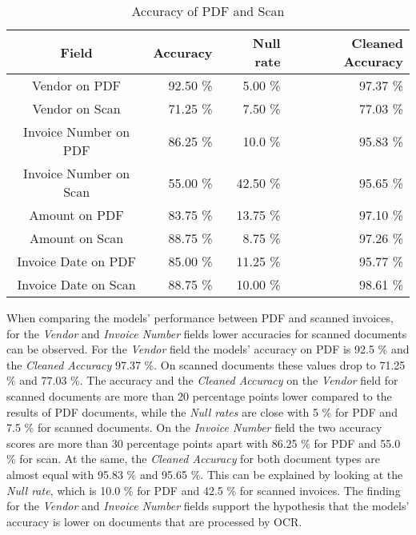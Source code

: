 \begin{table}[ht]   %
    \centering
    \footnotesize
    \begin{tabular}{c|rrr} %
        \toprule    %
        Field  & Accuracy  & Null rate & Cleaned Accuracy \\
        \midrule    %
        Vendor on PDF    & 92.50 \%   &  5.00 \%   & 97.37 \% \\
        Vendor on Scan   & 71.25 \%   &  7.50 \%   & 77.03 \% \\
        \midrule    %
        Invoice Number on PDF & 86.25 \%   & 10.0 \%  & 95.83 \%\\
        Invoice Number on Scan & 55.00 \%  & 42.50 \%  & 95.65 \%\\
        \midrule    %
        Amount on PDF      & 83.75 \%   & 13.75 \%  & 97.10 \% \\
        Amount on Scan     & 88.75 \%   & 8.75 \%  & 97.26 \% \\
        \midrule    %
        Invoice Date on PDF  & 85.00 \%   & 11.25  \%  & 95.77 \% \\
        Invoice Date on Scan & 88.75 \%   & 10.00  \%  & 98.61 \% \\
        
        \bottomrule %
    \end{tabular}
    \caption{Accuracy of PDF and Scan}
    \label{table:Field_Com_Scan_PDF}
\end{table}

When comparing the models' performance between PDF and scanned invoices, for the \textit{Vendor} and \textit{Invoice Number} fields lower accuracies for scanned documents can be observed. For the \textit{Vendor} field the models' accuracy on PDF is 92.5 \% and the \textit{Cleaned Accuracy} 97.37 \%. On scanned documents these values drop to 71.25 \% and 77.03 \%. The accuracy and the \textit{Cleaned Accuracy} on the \textit{Vendor} field for scanned documents are more than 20 percentage points lower compared to the results of PDF documents, while the \textit{Null rates} are close with 5 \% for PDF and 7.5 \% for scanned documents. On the \textit{Invoice Number} field the two accuracy scores are more than 30 percentage points apart with 86.25 \% for PDF and 55.0 \% for scan. At the same, the \textit{Cleaned Accuracy} for both document types are almost equal with 95.83 \% and 95.65 \%. This can be explained by looking at the \textit{Null rate}, which is 10.0 \% for PDF and 42.5 \% for scanned invoices. The finding for the \textit{Vendor} and \textit{Invoice Number} fields support the hypothesis that the models' accuracy is lower on documents that are processed by \ac{OCR}.

